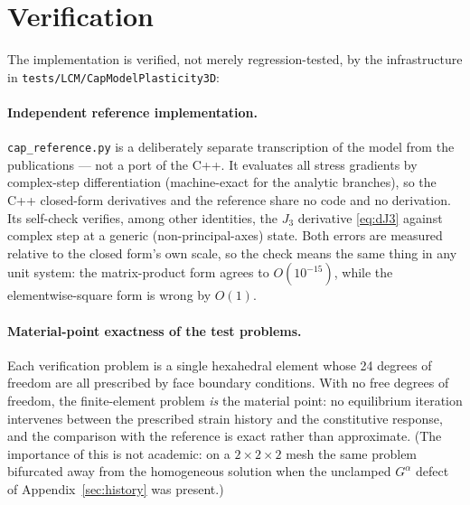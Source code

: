 \documentclass[12pt]{article}
\begin{document}
\section{Verification}
\label{sec:verification}

The implementation is verified, not merely regression-tested, by the
infrastructure in \texttt{tests/LCM/CapModelPlasticity3D}:

\paragraph{Independent reference implementation.}
\texttt{cap\_reference.py} is a deliberately separate transcription
of the model from the publications --- not a port of the C++. It
evaluates all stress gradients by complex-step differentiation
(machine-exact for the analytic branches), so the C++ closed-form
derivatives and the reference share no code and no derivation. Its
self-check verifies, among other identities, the $J_3$ derivative
\eqref{eq:dJ3} against complex step at a generic (non-principal-axes)
state. Both errors are measured relative to the closed form's own
scale, so the check means the same thing in any unit system: the
matrix-product form agrees to $O(10^{-15})$, while the
elementwise-square form is wrong by $O(1)$.

\paragraph{Material-point exactness of the test problems.}
Each verification problem is a single hexahedral element whose 24
degrees of freedom are all prescribed by face boundary conditions.
With no free degrees of freedom, the finite-element problem \emph{is}
the material point: no equilibrium iteration intervenes between the
prescribed strain history and the constitutive response, and the
comparison with the reference is exact rather than approximate. (The
importance of this is not academic: on a $2\times2\times2$ mesh the
same problem bifurcated away from the homogeneous solution when the
unclamped $G^\alpha$ defect of Appendix~\ref{sec:history} was
present.)
\end{document}
